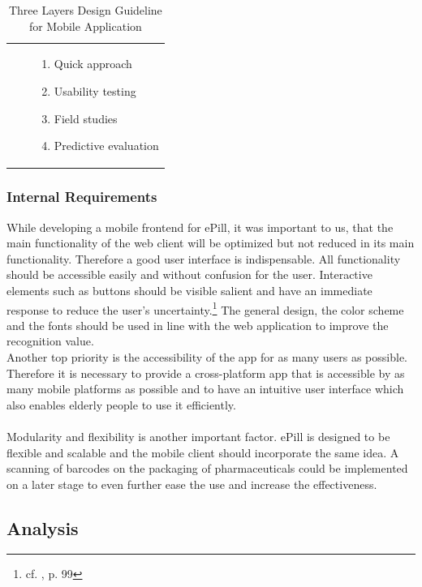 \begin{table}[!htb]
\begin{tabular}{c | c | p{23.5em}}
        \cline{3-3}
        & & 
            \begin{enumerate}
                \item Quick approach
                \item Usability testing
                \item Field studies
                \item Predictive evaluation
            \end{enumerate}
        \\
    \end{tabular}
    \caption[Three Layers Design Guideline for Mobile Application]{Three Layers Design Guideline for Mobile Application\footnotemark}
    \label{tab:ThreeLayersDesignGuideline}
\end{table}

\subsubsection{Internal Requirements}
While developing a mobile frontend for ePill, it was important to us, that the main functionality of the web client will be optimized but not reduced in its main functionality. Therefore a good user interface is indispensable. All functionality should be accessible easily and without confusion for the user. Interactive elements such as buttons should be visible salient and have an immediate response to reduce the user's uncertainty.\footnote{cf. \cite{Norman2002}, p. 99} The general design, the color scheme and the fonts should be used in line with the web application to improve the recognition value.
\\
Another top priority is the accessibility of the app for as many users as possible. Therefore it is necessary to provide a cross-platform app that is accessible by as many mobile platforms as possible and to have an intuitive user interface which also enables elderly people to use it efficiently.
\\
\\
Modularity and flexibility is another important factor. ePill is designed to be flexible and scalable and the mobile client should incorporate the same idea. A scanning of barcodes on the packaging of pharmaceuticals could be implemented on a later stage to even further ease the use and increase the effectiveness.
\subsection{Analysis}
\label{subsec:Analysis}
